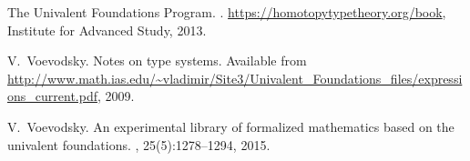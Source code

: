 \documentclass[reqno,10pt,a4paper,oneside,draft]{amsart}
\numberwithin{equation}{section}
\theoremstyle{mythm}
\theoremstyle{mydef}
\theoremstyle{myrmk}
\begin{document}
\begin{thebibliography}{{}dBM15}
The {Univalent Foundations Program}.
.
\newblock \url{https://homotopytypetheory.org/book}, Institute for Advanced
  Study, 2013.

V.~Voevodsky.
\newblock Notes on type systems.
\newblock Available from
  \url{http://www.math.ias.edu/~vladimir/Site3/Univalent_Foundations_files/expressions_current.pdf},
  2009.

V.~Voevodsky.
\newblock An experimental library of formalized mathematics based on the
  univalent foundations.
, 25(5):1278--1294,
  2015.

\end{thebibliography}
\end{document}
